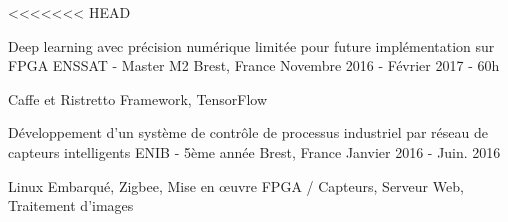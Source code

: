 

\begin{cventries}
<<<<<<< HEAD

\cventry
{Deep learning avec précision numérique limitée pour future implémentation sur FPGA } %
{ENSSAT - Master M2} %
{Brest, France} %
{Novembre 2016 - Février 2017 - 60h} %
{
	\begin{cvitems} %
		\item {Caffe et Ristretto Framework, TensorFlow}
	\end{cvitems}
}

\cventry
{Développement d’un système de contrôle de processus industriel par réseau de capteurs intelligents} %
{ENIB - 5ème année} %
{Brest, France} %
{Janvier 2016 - Juin. 2016 } %
{
	\begin{cvitems} %
		\item {Linux Embarqué, Zigbee, Mise en \oe{}uvre FPGA / Capteurs, Serveur Web, Traitement d’images }
	\end{cvitems}
}



\end{cventries}
